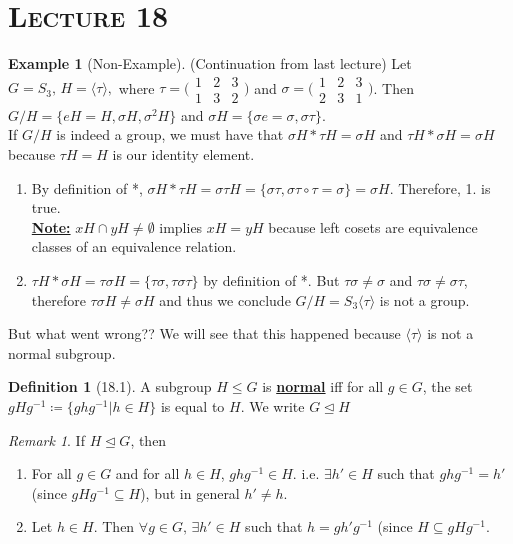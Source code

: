 \documentclass{article}
\newcommand{\es}{\emptyset}
\newcommand{\inter}{\cap}
\newcommand{\coleq}{\coloneqq}
\newcommand{\inverse}[1]{#1^{-1}}
\newcommand{\define}[1]{\textbf{\underline{#1}}}
\renewcommand{\Subset}{\subseteq}
\theoremstyle{definition}
\newtheorem*{defn}{Definition}
\newtheorem*{ex}{Example}
\theoremstyle{remark}
\newtheorem*{rmk}{Remark}
\newcommand{\cyc}[1]{\langle#1\rangle}
\newcommand{\normal}{\unlhd}
\begin{document}
    \section*{\textbf{\textsc{Lecture 18}}}{
        \begin{ex}[Non-Example]
            (Continuation from last lecture) Let $G=S_3, \, H= \cyc{\tau},$ where $\tau=\big(\begin{smallmatrix} 1&2&3\\ 1&3&2 \end{smallmatrix}\big)$ and $\sigma= \big(\begin{smallmatrix} 1&2&3\\ 2&3&1 \end{smallmatrix}\big)$. Then $G/H=\{eH=H,\sigma H, \sigma^2H\}$ and $\sigma H=\{\sigma e=\sigma, \sigma\tau\}$.\\
            If $G/H$ is indeed a group, we must have that $\sigma H * \tau H=\sigma H$ and $\tau H * \sigma H=\sigma H$ because $\tau H=H$ is our identity element.
            \begin{enumerate}
                \item By definition of *, $\sigma H * \tau H=\sigma \tau H= \{\sigma\tau, \sigma\tau \circ \tau = \sigma\}=\sigma H$. Therefore, 1. is true.\\
                \define{Note:} $xH\inter yH\neq \es$ implies $xH=yH$ because left cosets are equivalence classes of an equivalence relation.
                \item $\tau H * \sigma H=\tau\sigma H=\{\tau\sigma, \tau\sigma\tau\}$ by definition of *. But $\tau\sigma \neq \sigma$ and $\tau\sigma \neq \sigma\tau$, therefore $\tau\sigma H \neq \sigma H$ and thus we conclude $G/H=S_3\cyc{\tau}$ is not a group.
            \end{enumerate}
        \end{ex}
        
        But what went wrong?? We will see that this happened because $\cyc{\tau}$ is not a normal subgroup.
        
        \begin{defn}[18.1]
            A subgroup $H\leq G$ is \define{normal} iff for all $g \in G$, the set $gH\inverse{g}\coleq\{gh\inverse{g}|h \in H\}$ is equal to $H$. We write $G \normal H$
        \end{defn}
        
        \begin{rmk}
            If $H \normal G$, then
            \begin{enumerate}
                \item For all $g \in G$ and for all $h \in H$, $gh\inverse{g}\in H$. i.e. $\exists h'\in H$ such that $gh\inverse{g}=h'$ (since $gH\inverse{g}\Subset H$), but in general $h'\neq h$.
                \item Let $h \in H$. Then $\forall g \in G, \, \exists h' \in H$ such that $h=gh'\inverse{g}$ (since $H \Subset gH\inverse{g}$.
            \end{enumerate}
        \end{rmk}
        
}
\end{document}
